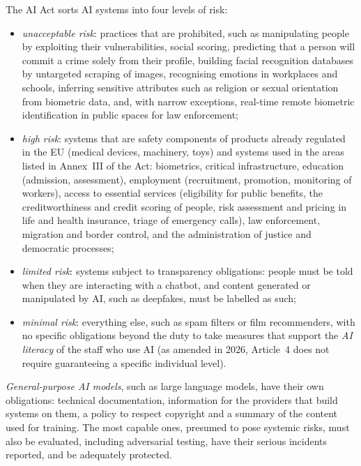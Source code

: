 The AI Act sorts AI systems into four levels of risk:
\begin{itemize}
  \item \emph{unacceptable risk}: practices that are prohibited, such as manipulating people by exploiting
        their vulnerabilities, social scoring, predicting that a person will commit a crime solely from their
        profile, building facial recognition databases by untargeted scraping of images, recognising emotions in
        workplaces and schools, inferring sensitive attributes such as religion or sexual orientation from
        biometric data, and, with narrow exceptions, real-time remote biometric identification in public spaces
        for law enforcement;
  \item \emph{high risk}: systems that are safety components of products already regulated in the EU (medical
        devices, machinery, toys) and systems used in the areas listed in Annex~III of the Act: biometrics,
        critical infrastructure, education (admission, assessment), employment (recruitment, promotion,
        monitoring of workers), access to essential services (eligibility for public benefits, the
        creditworthiness and credit scoring of people, risk assessment and pricing in life and health insurance,
        triage of emergency calls), law enforcement, migration and border control, and the administration of
        justice and democratic processes;
  \item \emph{limited risk}: systems subject to transparency obligations: people must be told when they are
        interacting with a chatbot, and content generated or manipulated by AI, such as deepfakes, must be
        labelled as such;
  \item \emph{minimal risk}: everything else, such as spam filters or film recommenders, with no specific
        obligations beyond the duty to take measures that support the \emph{AI literacy} of the staff who use
        AI (as amended in 2026, Article~4 does not require guaranteeing a specific individual level).
\end{itemize}
\emph{General-purpose AI models}, such as large language models, have their own obligations: technical documentation,
information for the providers that build systems on them, a policy to respect copyright and a summary of the
content used for training. The most capable ones, presumed to pose systemic risks, must also be evaluated, including
adversarial testing, have their serious incidents reported, and be adequately protected.


